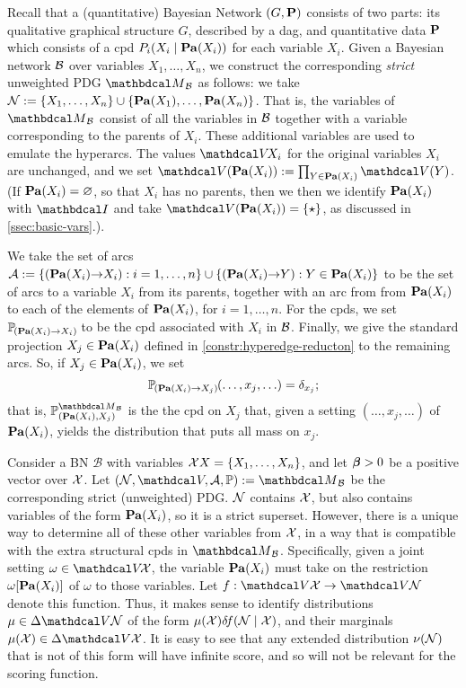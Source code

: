 \begin{subappendices}
\begin{defn}\label{def:bn2PDG}
Recall that a (quantitative) Bayesian Network $(G, \mathbf P)$ consists of two
parts: its qualitative graphical structure $G$, 
described by a dag,
and quantitative data $\mathbf P$ which consists of 
a cpd $P_i(X_i \mid \mathop{\mathbf{Pa}}\nolimits(X_i))$ for each variable $X_i$.
Given a Bayesian network $\cal B$ over variables
$X_1, \ldots, X_n$, we construct the corresponding \emph{strict} unweighted PDG
%
$\PDGof{{\mathcal B}}$
			as follows: we take $\mathcal N := \{X_1, \ldots, X_n \} \cup
			\{ \mathop{\mathbf{Pa}}\nolimits(X_1), \ldots, \mathop{\mathbf{Pa}}\nolimits(X_n)\}$.  
That is, the variables of 
	  $\PDGof{{\mathcal B}}$
consist of all the variables in
${\cal B}$ together with a variable corresponding to the parents
of $X_i$.
These additional variables are used to emulate the hyperarcs.  
The values $\V\!X_i$ for the original variables
			$X_i$ are unchanged, 
and we set $\V(\Pa(X_i)) := \prod_{Y \in \Pa(X_i)} \V(Y)$.
(If $\mathop{\mathbf{Pa}}\nolimits(X_i) = \varnothing$, so that $X_i$ has no parents, then we 
then we identify $\mathop{\mathbf{Pa}}\nolimits(X_i)$ with $\pdgunit$ and
take $\V(\Pa(X_i)) = \{\star\}$, as discussed in \cref{ssec:basic-vars}.).

We take the set of arcs $\mathcal A := \{ (\mathop{\mathbf{Pa}}\nolimits(X_i){\to} X_i) : 
i = 1, \ldots, n \} \cup \{ (\mathop{\mathbf{Pa}}\nolimits(X_i){\to}Y) : Y \in
			\mathop{\mathbf{Pa}}\nolimits(X_i)\}$ to be the set of arcs to a variable $X_i$
	  from its parents, together with an arc from
	  from $\mathop{\mathbf{Pa}}\nolimits(X_i)$ to each of the elements of $\mathop{\mathbf{Pa}}\nolimits(X_i)$, for
	  $i = 1, \ldots, n$.  
For the cpds, we set $\p_{(\Pa(X_i){\to}X_i)}$ to be the cpd associated
			with $X_i$ in $\cal B$.
Finally, we give the standard projection
    $X_j \in \mathop{\mathbf{Pa}}\nolimits(X_i)$ defined in \cref{constr:hyperedge-reducton}
    to the remaining arcs.
So, if $X_j \in \mathop{\mathbf{Pa}}\nolimits(X_i)$, we set
\[ \p_{(\Pa(X_i){\to}X_j)}(\ldots, x_j, \ldots) = \delta_{x_j};\]
that is,
$\mathbb P_{(\Pa(X_i), X_j)}^{\PDGof{\mathcal B}}$ is the the cpd 
on $X_j$ that, given a setting $(\ldots, x_j, \ldots)$ of $\mathop{\mathbf{Pa}}\nolimits(X_i)$, yields the distribution that puts all mass on $x_j$. 
\end{defn}

Consider a BN $\mathcal B$  with variables $\mathcal X X = \{X_1,\ldots, X_n\}$, and let $\boldsymbol\beta > 0$ be a positive vector over $\mathcal X$.
Let $(\N, \V, \Ar, \mathbb P) := \PDGof{\mathcal B}$ 
be the corresponding strict (unweighted) PDG.
$\mathcal N$ contains $\mathcal X$, but also contains variables of the form $\mathop{\mathbf{Pa}}\nolimits(X_i)$,
    so it is a strict superset.
However, there is a unique way to determine all of these other variables from $\mathcal X$, in a way that is compatible with the extra structural cpds in $\PDGof{\cal B}$.
Specifically, given a joint setting $\omega \in \V\!\X$, the variable $\mathop{\mathbf{Pa}}\nolimits(X_i)$ must take on the restriction $\omega[\mathop{\mathbf{Pa}}\nolimits(X_i)]$ of $\omega$ to those variables. Let $f: \V\X \to \V\N$ denote this function.
Thus, it makes sense to identify distributions
    $\mu \in \Delta \V\N$ of the form $\mu(\mathcal X) \delta\!f(\mathcal N \mid \mathcal X)$,
    and their marginals $\mu(\X) \in \Delta \V\X$.
It is easy to see that any extended distribution $\nu(\mathcal N)$ that is not of this form will have infinite score, and so will not be relevant for the scoring function.


\end{subappendices}
